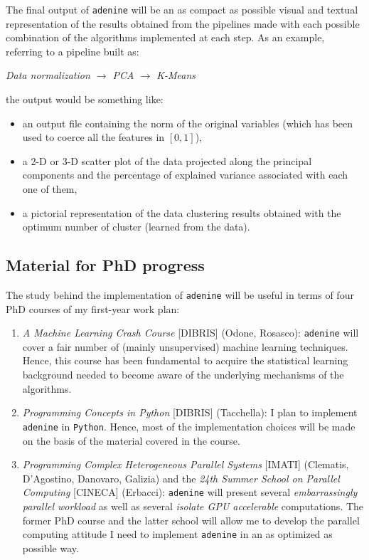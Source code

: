 \documentclass[paper=a4, fontsize=10pt]{scrartcl} %
\numberwithin{equation}{section} %
\numberwithin{figure}{section} %
\numberwithin{table}{section} %
\newcommand{\adenine}{{\tt adenine}\xspace}
\begin{document}
The final output of \adenine will be an as compact as possible visual and textual representation of 
the results obtained from the pipelines made with each possible combination of the algorithms
implemented at each step. As an example, referring to a pipeline built as:

\begin{center}
{\sl Data normalization $\rightarrow$ PCA $\rightarrow$ K-Means}
\end{center}

the output would be something like:

\begin{itemize}

	\item an output file containing the norm of the original variables (which has
	been  used to coerce all the features in $[0,1]$),

  	\item a 2-D or 3-D scatter plot of the data projected along the principal
	components   and the percentage of explained variance associated   with each
	one of them,

	\item a pictorial representation of the data clustering results
	obtained with the optimum number of cluster (learned from the data).

\end{itemize}

\subsection{Material for PhD progress}

The study behind the implementation of \adenine  will be useful in terms of
four PhD courses of my first-year work plan:

\begin{enumerate}

	\item {\sl A Machine Learning Crash Course} [DIBRIS] (Odone, Rosasco): \adenine will cover
	a fair number of (mainly unsupervised) machine learning techniques. Hence, this course
	has been fundamental to acquire the statistical learning background needed to become aware of
	the underlying mechanisms of the algorithms.

	\item {\sl Programming Concepts in Python} [DIBRIS] (Tacchella):  I plan to implement \adenine in
	{\tt Python}. Hence,  most of the implementation choices will be made on the basis of the material
	covered in the course.

  	\item {\sl Programming Complex Heterogeneous Parallel Systems} [IMATI]
	(Clematis,   D'Agostino, Danovaro, Galizia) and {the \sl 24th Summer School on
	Parallel Computing} [CINECA] (Erbacci): \adenine will present several {\sl embarrassingly
	parallel workload} as well as several {\sl isolate GPU accelerable} computations. 
	The former PhD course and the latter school will allow me to develop the parallel computing
	attitude I need to implement \adenine in an as optimized as possible way.

\end{enumerate}
\end{document}
